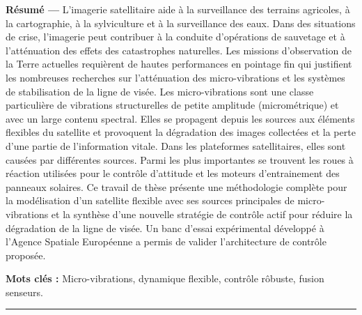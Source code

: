 \begin{vcenterpage}

\thispagestyle{empty}
{\large\textbf{Résumé ---}}
  L’imagerie satellitaire aide à la surveillance des terrains agricoles, à la cartographie,  à la sylviculture et à la surveillance des eaux. Dans des situations de crise, l’imagerie peut contribuer à la conduite d’opérations de sauvetage  et à l’atténuation des effets des catastrophes naturelles. 
Les missions d’observation de la Terre actuelles requièrent de hautes performances en pointage fin qui justifient les nombreuses recherches sur l’atténuation des  micro-vibrations et les systèmes de stabilisation de la ligne de visée. Les micro-vibrations sont une classe particulière de vibrations structurelles de petite amplitude (micrométrique) et avec un large contenu spectral. Elles se propagent depuis les sources aux éléments flexibles du satellite et provoquent la dégradation des images collectées et la perte d’une partie de l’information vitale. Dans les plateformes satellitaires, elles sont causées par différentes sources. Parmi les plus importantes se trouvent les roues à réaction utilisées pour le contrôle d’attitude et les moteurs d’entrainement des panneaux solaires. 
Ce travail de thèse présente une méthodologie complète pour la modélisation  d’un satellite flexible avec ses sources principales de micro-vibrations et la synthèse d’une nouvelle stratégie de contrôle actif pour réduire la dégradation de la ligne de visée.   
Un banc d’essai expérimental développé à l’Agence Spatiale Européenne a permis de valider l'architecture de contrôle proposée.

{\large\textbf{Mots clés :}}
    Micro-vibrations, dynamique flexible, contrôle r\^{o}buste, fusion senseurs.
\\
\noindent\rule[2pt]{\textwidth}{0.5pt}



\end{vcenterpage}
